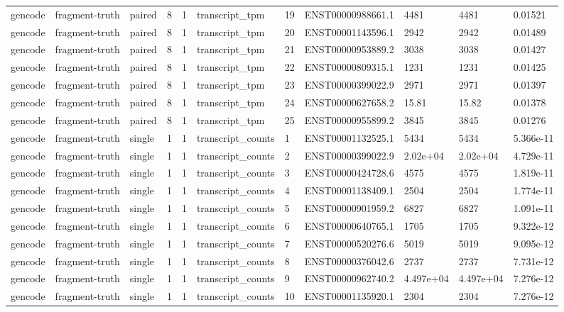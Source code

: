 \begin{tabular}{lllllllllll}
gencode & fragment-truth & paired & 8 & 1 & transcript\_tpm & 19 & ENST00000988661.1 & 4481 & 4481 & 0.01521 \\
gencode & fragment-truth & paired & 8 & 1 & transcript\_tpm & 20 & ENST00001143596.1 & 2942 & 2942 & 0.01489 \\
gencode & fragment-truth & paired & 8 & 1 & transcript\_tpm & 21 & ENST00000953889.2 & 3038 & 3038 & 0.01427 \\
gencode & fragment-truth & paired & 8 & 1 & transcript\_tpm & 22 & ENST00000809315.1 & 1231 & 1231 & 0.01425 \\
gencode & fragment-truth & paired & 8 & 1 & transcript\_tpm & 23 & ENST00000399022.9 & 2971 & 2971 & 0.01397 \\
gencode & fragment-truth & paired & 8 & 1 & transcript\_tpm & 24 & ENST00000627658.2 & 15.81 & 15.82 & 0.01378 \\
gencode & fragment-truth & paired & 8 & 1 & transcript\_tpm & 25 & ENST00000955899.2 & 3845 & 3845 & 0.01276 \\
gencode & fragment-truth & single & 1 & 1 & transcript\_counts & 1 & ENST00001132525.1 & 5434 & 5434 & 5.366e-11 \\
gencode & fragment-truth & single & 1 & 1 & transcript\_counts & 2 & ENST00000399022.9 & 2.02e+04 & 2.02e+04 & 4.729e-11 \\
gencode & fragment-truth & single & 1 & 1 & transcript\_counts & 3 & ENST00000424728.6 & 4575 & 4575 & 1.819e-11 \\
gencode & fragment-truth & single & 1 & 1 & transcript\_counts & 4 & ENST00001138409.1 & 2504 & 2504 & 1.774e-11 \\
gencode & fragment-truth & single & 1 & 1 & transcript\_counts & 5 & ENST00000901959.2 & 6827 & 6827 & 1.091e-11 \\
gencode & fragment-truth & single & 1 & 1 & transcript\_counts & 6 & ENST00000640765.1 & 1705 & 1705 & 9.322e-12 \\
gencode & fragment-truth & single & 1 & 1 & transcript\_counts & 7 & ENST00000520276.6 & 5019 & 5019 & 9.095e-12 \\
gencode & fragment-truth & single & 1 & 1 & transcript\_counts & 8 & ENST00000376042.6 & 2737 & 2737 & 7.731e-12 \\
gencode & fragment-truth & single & 1 & 1 & transcript\_counts & 9 & ENST00000962740.2 & 4.497e+04 & 4.497e+04 & 7.276e-12 \\
gencode & fragment-truth & single & 1 & 1 & transcript\_counts & 10 & ENST00001135920.1 & 2304 & 2304 & 7.276e-12 \\

\end{tabular}
